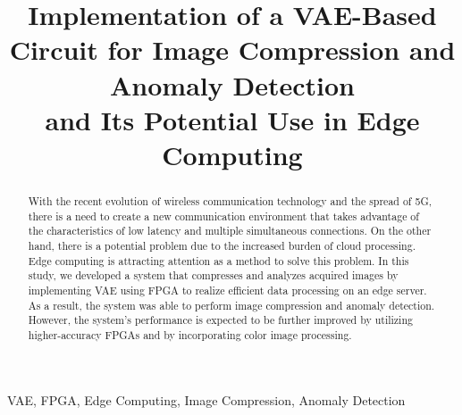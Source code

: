 \documentclass[conference]{IEEEtran}
\begin{document}
\title{Implementation of a VAE-Based Circuit for Image Compression and Anomaly Detection \\and Its Potential Use in Edge Computing\\
}

\author{
\and
{}
}

\maketitle

\begin{abstract}
With the recent evolution of wireless communication technology and the spread of 5G, there is a need to create a new communication environment that takes advantage of the characteristics of low latency and multiple simultaneous connections.
On the other hand, there is a potential problem due to the increased burden of cloud processing.
Edge computing is attracting attention as a method to solve this problem.
In this study, we developed a system that compresses and analyzes acquired images by implementing VAE using FPGA to realize efficient data processing on an edge server.
As a result, the system was able to perform image compression and anomaly detection.
However, the system's performance is expected to be further improved by utilizing higher-accuracy FPGAs and by incorporating color image processing.
\end{abstract}

\begin{IEEEkeywords}
VAE, FPGA, Edge Computing, Image Compression, Anomaly Detection
\end{IEEEkeywords}
\end{document}
